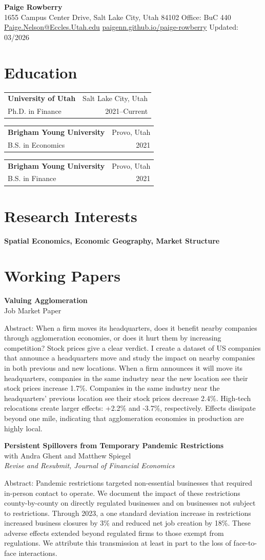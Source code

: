 \documentclass[11pt]{article}
\makeatletter
\newcommand{\eduentry}[4]{%
\begin{tabular*}{\textwidth}{@{}l@{\extracolsep{\fill}}r@{}}
\textbf{#1} & #2 \\
#3 & #4 \\
\end{tabular*}\vspace{0.6em}
}
\newcommand{\cvsection}[2][12]{%
\Needspace{#1\baselineskip}%
\section*{#2}%
}
\newenvironment{paperentry}{%
\samepage
}{%
\vspace{0.6em}%
\par
}
\makeatother
\begin{document}
\pagestyle{plain}

\begin{center}
{\LARGE \textbf{Paige Rowberry}}\\[0.3em]
1655 Campus Center Drive, Salt Lake City, Utah 84102 \textbar{} Office: BuC 440\\
\href{mailto:Paige.Nelson@Eccles.Utah.edu}{Paige.Nelson@Eccles.Utah.edu} \textbar{}
\href{https://paigenn.github.io/paige-rowberry/}{paigenn.github.io/paige-rowberry} \textbar{} Updated: 03/2026
\end{center}

\cvsection{Education}
\eduentry{University of Utah}{Salt Lake City, Utah}{Ph.D. in Finance}{2021--Current}
\eduentry{Brigham Young University}{Provo, Utah}{B.S. in Economics}{2021}
\eduentry{Brigham Young University}{Provo, Utah}{B.S. in Finance}{2021}

\cvsection{Research Interests}
\textbf{Spatial Economics, Economic Geography, Market Structure}

\cvsection{Working Papers}
\begin{paperentry}
\textbf{Valuing Agglomeration}\\
Job Market Paper

Abstract: When a firm moves its headquarters, does it benefit nearby companies through agglomeration economies, or does it hurt them by increasing competition? Stock prices give a clear verdict. I create a dataset of US companies that announce a headquarters move and study the impact on nearby companies in both previous and new locations. When a firm announces it will move its headquarters, companies in the same industry near the new location see their stock prices increase 1.7\%. Companies in the same industry near the headquarters' previous location see their stock prices decrease 2.4\%. High-tech relocations create larger effects: +2.2\% and -3.7\%, respectively. Effects dissipate beyond one mile, indicating that agglomeration economies in production are highly local.
\end{paperentry}

\begin{paperentry}
\textbf{Persistent Spillovers from Temporary Pandemic Restrictions}\\
with Andra Ghent and Matthew Spiegel\\
\emph{Revise and Resubmit, Journal of Financial Economics}

Abstract: Pandemic restrictions targeted non-essential businesses that required in-person contact to operate. We document the impact of these restrictions county-by-county on directly regulated businesses and on businesses not subject to restrictions. Through 2023, a one standard deviation increase in restrictions increased business closures by 3\% and reduced net job creation by 18\%. These adverse effects extended beyond regulated firms to those exempt from regulations. We attribute this transmission at least in part to the loss of face-to-face interactions.
\end{paperentry}
\end{document}
